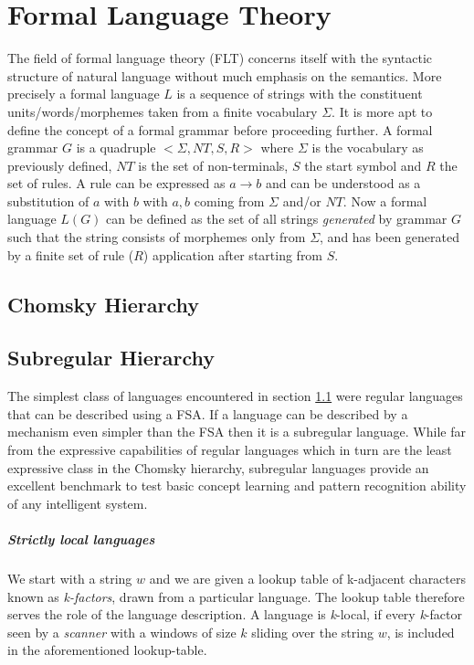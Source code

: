 \section{Formal Language Theory}
The field of formal language theory (FLT) concerns itself with the syntactic structure of natural language without much emphasis on the semantics. More precisely a formal language $L$ is a sequence of strings with the constituent units/words/morphemes taken from a finite vocabulary $\Sigma$. It is more apt to define the concept of a formal grammar before proceeding further. A formal grammar $G$ is a quadruple $<\Sigma, NT, S, R>$ where $\Sigma$ is the vocabulary as previously defined, $NT$ is the set of non-terminals, $S$ the start symbol and $R$ the set of rules. A rule can be expressed as $a \rightarrow b$ and can be understood as a substitution of $a$ with $b$ with $a, b$ coming from $\Sigma$ and/or $NT$. Now a formal language $L(G)$ can be defined as the set of all strings  \textit{generated} by grammar $G$ such that the string consists of morphemes only from $\Sigma$, and has been generated by a finite set of rule ($R$) application after starting from $S$.



\subsection{Chomsky Hierarchy}\label{flt:ch}
\blindtext

\subsection{Subregular Hierarchy}\label{flt:sh}
The simplest class of languages encountered in section \ref{flt:ch} were regular languages that can be described using a FSA. If a language can be described by a mechanism even simpler than the FSA then it is a subregular language. While far from the expressive capabilities of regular languages which in turn are the least expressive class in the Chomsky hierarchy, subregular languages provide an excellent benchmark to test basic concept learning and pattern recognition ability of any intelligent system.

\subparagraph{Strictly local languages} We start with a string $w$ and we are given a lookup table of k-adjacent characters known as \textit{k-factors}, drawn from a particular language. The lookup table therefore serves the role of the language description. A language is \textit{k}-local, if every \textit{k}-factor seen by a \textit{scanner} with a windows of size $k$ sliding over the string $w$, is included in the aforementioned lookup-table.  

